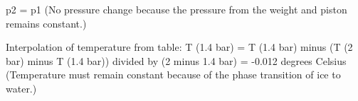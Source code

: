 p2 = p1 (No pressure change because the pressure from the weight and piston remains constant.)  

Interpolation of temperature from table:  
T (1.4 bar) = T (1.4 bar) minus (T (2 bar) minus T (1.4 bar)) divided by (2 minus 1.4 bar)  
= -0.012 degrees Celsius (Temperature must remain constant because of the phase transition of ice to water.)